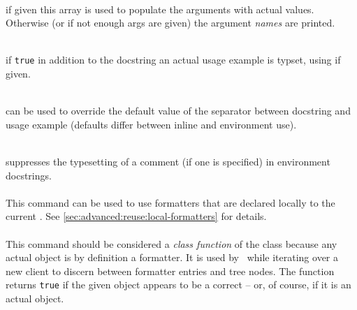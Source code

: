 \documentclass[12pt]{scrartcl}
\begin{document}
\begin{itemize*}
\item {}\\
if given this array is used to populate the arguments with actual values.
Otherwise (or if not enough args are given) the argument \emph{names} are
printed.

\item {}\\
if \texttt{true} in addition to the docstring an actual usage example is
typset, using  if given.

\item {}\\
can be used to override the default value of the separator between docstring
and usage example (defaults differ between inline and environment use).

\item {}\\
suppresses the typesetting of a comment (if one is specified) in environment
docstrings.
\end{itemize*}

\paragraph{}
\label{sec:advanced:formatter:format}

This command can be used to use formatters that are declared locally to the
current .  See \vref{sec:advanced:reuse:local-formatters} for
details.

\paragraph{}
\label{sec:advanced:formatter:is-formatter}

This command should be considered a \emph{class function} of the
 class because any actual  object is by
definition a formatter.  It is used by \luatemplates\ while iterating over a new
client to discern between formatter entries and tree nodes.  The function
returns \texttt{true} if the given object appears to be a correct
 -- or, of course, if it is an actual
 object.


\paragraph{}
\label{sec:advanced:formatter:update}
\end{document}
